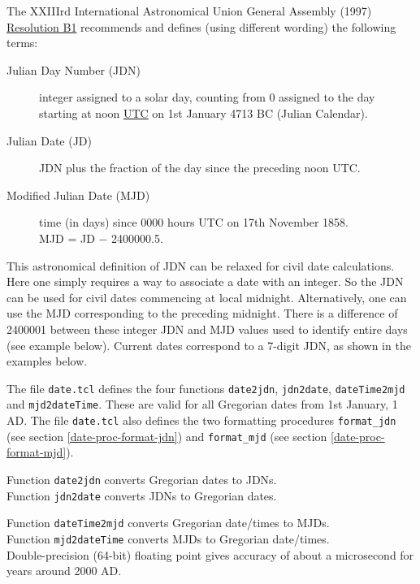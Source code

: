 The XXIIIrd International Astronomical Union General Assembly
      (1997) 
      \href{http://www.iers.org/iers/earth/resolutions/UAI-b1.html}{Resolution B1} recommends and defines (using different wording) the
      following terms:
      \begin{description}
        \item[Julian Day Number (JDN)]
        integer assigned to a solar day, counting from 0 assigned
        to the day starting at noon 
        \href{http://tycho.usno.navy.mil/systime.html}{UTC} on
        1st January 4713 BC (Julian Calendar).
        \item[Julian Date (JD)]
        JDN plus the fraction of the day since the preceding noon
        UTC.
        \item[Modified Julian Date (MJD)]
        time (in days) since 0000 hours UTC on 17th November 1858.
        \\MJD = JD $-$ 2400000.5.
      \end{description}
      

This astronomical definition of JDN can be relaxed for civil
      date calculations. Here one simply requires a way to associate a
      date with an integer. So the JDN can be used for civil dates
      commencing at local midnight. Alternatively, one can use the MJD
      corresponding to the preceding midnight. There is a difference of
      2400001 between these integer JDN and MJD values used to identify
      entire days (see example below). Current dates correspond to a
      7-digit JDN, as shown in the examples below.

The file 
      \texttt{date.tcl} defines the four functions 
      \texttt{date2jdn}, 
      \texttt{jdn2date}, 
      \texttt{dateTime2mjd} and 
      \texttt{mjd2dateTime}. These are valid for all Gregorian
      dates from 1st January, 1 AD. The file 
      \texttt{date.tcl} also defines the two formatting procedures 
\texttt{format\_jdn} (see section \ref{date-proc-format-jdn})
and 
\texttt{format\_mjd} (see section \ref{date-proc-format-mjd}).
      

Function 
      \texttt{date2jdn} converts Gregorian dates to JDNs.
      \\Function 
      \texttt{jdn2date} converts JDNs to Gregorian dates.
      

Function 
      \texttt{dateTime2mjd} converts Gregorian date/times to MJDs.
      \\Function 
      \texttt{mjd2dateTime} converts MJDs to Gregorian date/times.
      \\Double-precision (64-bit) floating point gives accuracy of
      about a microsecond for years around 2000 AD.
      

